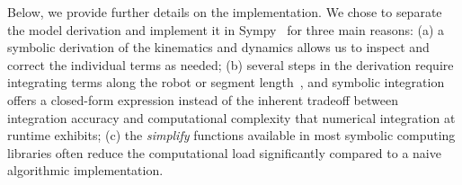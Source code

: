 
Below, we provide further details on the implementation. We chose to separate the model derivation and implement it in Sympy~\citep{meurer2017sympy} for three main reasons: (a) a symbolic derivation of the kinematics and dynamics allows us to inspect and correct the individual terms as needed; (b) several steps in the derivation require integrating terms along the robot or segment length~\citep{renda2018discrete, della2023model}, and symbolic integration offers a closed-form expression instead of the inherent tradeoff between integration accuracy and computational complexity that numerical integration at runtime exhibits; (c) the \emph{simplify} functions available in most symbolic computing libraries often reduce the computational load significantly compared to a naive algorithmic implementation.


